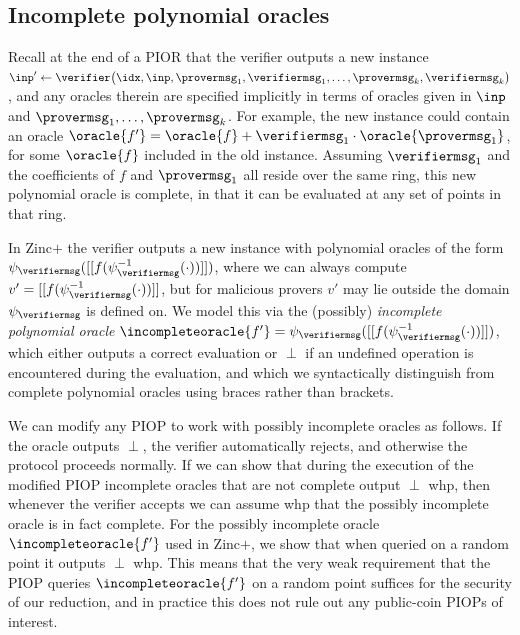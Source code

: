 \subsection{Incomplete polynomial oracles}
\label{sec:incomplete-oracles}

Recall at the end of a PIOR that the verifier outputs a new instance $\inp' \gets \verifier\bigl(\idx,\inp,\provermsg_1,\verifiermsg_1,\dots,\provermsg_k,\verifiermsg_k\bigr)$, and any oracles therein are specified implicitly in terms of oracles given in $\inp$ and $\provermsg_1,\dots,\provermsg_k$. For example, the new instance could contain an oracle $\oracle{f'} = \oracle{f} + \verifiermsg_1 \cdot \oracle{\provermsg_1}$, for some $\oracle{f}$ included in the old instance. Assuming $\verifiermsg_1$ and the coefficients of $f$ and $\provermsg_1$ all reside over the same ring, this new polynomial oracle is complete, in that it can be evaluated at any set of points in that ring.

In Zinc$+$ the verifier outputs a new instance with polynomial oracles of the form $\psi_\verifiermsg([[f(\psi_{\verifiermsg}^{-1}{(\cdot)})]])$, where we can always compute $v' = [[f(\psi_{\verifiermsg}^{-1}{(\cdot)})]]$, but for malicious provers $v'$ may lie outside the domain $\psi_\verifiermsg$ is defined on. We model this via the (possibly) \emph{incomplete polynomial oracle} $\incompleteoracle{f'} = \psi_\verifiermsg([[f(\psi_{\verifiermsg}^{-1}{(\cdot)})]])$, which either outputs a correct evaluation or $\perp$ if an undefined operation is encountered during the evaluation, and which we syntactically distinguish from complete polynomial oracles using braces rather than brackets.

We can modify any PIOP to work with possibly incomplete oracles as follows. If the oracle outputs $\perp$, the verifier automatically rejects, and otherwise the protocol proceeds normally. If we can show that during the execution of the modified PIOP incomplete oracles that are not complete output $\perp$ whp, then whenever the verifier accepts we can assume whp that the possibly incomplete oracle is in fact complete. For the possibly incomplete oracle $\incompleteoracle{f'}$ used in Zinc$+$, we show that when queried on a random point it outputs $\perp$ whp. This means that the very weak requirement that the PIOP queries $\incompleteoracle{f'}$ on a random point suffices for the security of our reduction, and in practice this does not rule out any public-coin PIOPs of interest.